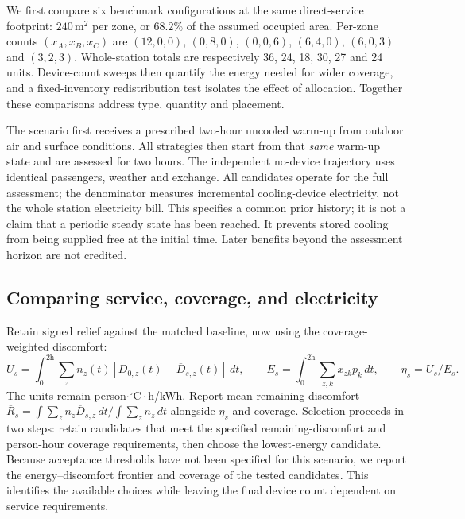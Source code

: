 We first compare six benchmark configurations at the same direct-service footprint: $240\,\mathrm{m^2}$ per zone, or $68.2\%$ of the assumed occupied area. Per-zone counts $(x_A,x_B,x_C)$ are $(12,0,0)$, $(0,8,0)$, $(0,0,6)$, $(6,4,0)$, $(6,0,3)$ and $(3,2,3)$. Whole-station totals are respectively 36, 24, 18, 30, 27 and 24 units. Device-count sweeps then quantify the energy needed for wider coverage, and a fixed-inventory redistribution test isolates the effect of allocation. Together these comparisons address type, quantity and placement.

The scenario first receives a prescribed two-hour uncooled warm-up from outdoor air and surface conditions. All strategies then start from that \emph{same} warm-up state and are assessed for two hours. The independent no-device trajectory uses identical passengers, weather and exchange. All candidates operate for the full assessment; the denominator measures incremental cooling-device electricity, not the whole station electricity bill. This specifies a common prior history; it is not a claim that a periodic steady state has been reached. It prevents stored cooling from being supplied free at the initial time. Later benefits beyond the assessment horizon are not credited.

\subsection{Comparing service, coverage, and electricity}

Retain signed relief against the matched baseline, now using the coverage-weighted discomfort:
\begin{equation}
 U_s=\int_0^{2\mathrm h}\sum_z n_z(t)[D_{0,z}(t)-\overline D_{s,z}(t)]\,dt,
 \qquad E_s=\int_0^{2\mathrm h}\sum_{z,k}x_{zk}p_k\,dt,
 \qquad \eta_s=U_s/E_s.
\label{eq:rail-efficiency}
\end{equation}
The units remain person$\cdot{}^{\circ}\mathrm C\cdot$h/kWh. Report mean remaining discomfort $\overline R_s=\int\sum_z n_z\overline D_{s,z}\,dt/\int\sum_z n_z\,dt$ alongside $\eta_s$ and coverage. Selection proceeds in two steps: retain candidates that meet the specified remaining-discomfort and person-hour coverage requirements, then choose the lowest-energy candidate. Because acceptance thresholds have not been specified for this scenario, we report the energy--discomfort frontier and coverage of the tested candidates. This identifies the available choices while leaving the final device count dependent on service requirements.

